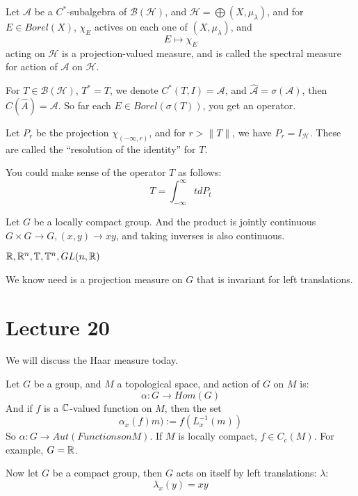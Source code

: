 Let $\mathcal{A}$ be a $C^*$-subalgebra of $\mathcal{B}(\mathcal{H})$, and $\mathcal{H}=\bigoplus(X, \mu_\lambda)$, and for $E\in Borel(X)$, $\chi_E$ actives on each one of $(X,\mu_\lambda)$, and 
\begin{equation*}
    E\mapsto \chi_E
\end{equation*}
acting on $\mathcal{H}$ is a projection-valued measure, and is called the spectral measure for action of $\mathcal{A}$ on $\mathcal{H}$.

For $T\in\mathcal{B}(\mathcal{H})$, $T^*=T$, we denote $C^*(T,I)=\mathcal{A}$, and $\widehat{\mathcal{A}}=\sigma(\mathcal{A})$, then $C(\widehat{A})=\mathcal{A}$. So far each $E\in Borel(\sigma(T))$, you get an operator.

Let $P_r$ be the projection $\chi_{(-\infty, r)}$, and for $r>\|T\|$, we have $P_r=I_\mathcal{H}$. These are called the ``resolution of the identity'' for $T$.

You could make sense of the operator $T$ as follows:
\begin{equation*}
    T=\int_{-\infty}^\infty tdP_t
\end{equation*}

Let $G$ be a locally compact group. And the product is jointly continuous $G\times G\to G, (x,y)\to xy$, and taking inverses is also continuous.

\begin{example}
    $\mathbb{R}, \mathbb{R}^n, \mathbb{T}, \mathbb{T}^n, GL(n,\mathbb{R})$
\end{example}
We know need is a projection measure on $G$ that is invariant for left translations. 


\section{Lecture 20}
We will discuss the Haar measure today.

Let $G$ be a group, and $M$ a topological space, and action of $G$ on $M$ is:
\begin{equation*}
    \alpha: G\to Hom(G)
\end{equation*}
And if $f$ is a $\mathbb{C}$-valued function on $M$, then the set 
\begin{equation*}
    \alpha_x(f)m):=f(L_x^{-1}(m))
\end{equation*}
So $\alpha: G\to Aut(Functions on M)$. 
If $M$ is locally compact, $f\in C_c(M)$. For example, $G=\mathbb{R}$.

Now let $G$ be a compact group, then $G$ acts on itself by left translations: $\lambda$:
\begin{equation*}
    \lambda_x(y)=xy
\end{equation*} 

